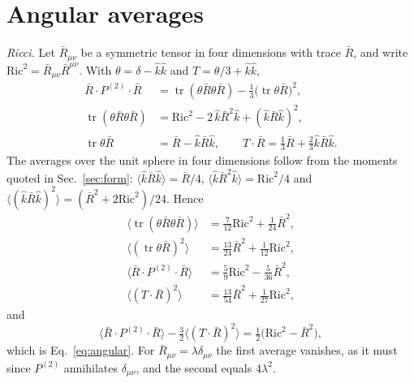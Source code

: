 \documentclass[a4paper,11pt]{article}
\newcommand{\Pt}{P^{(2)}}
\newcommand{\Ric}{\mathrm{Ric}}
\begin{document}
\section{Angular averages}
\label{app:angular}

\textit{Ricci.} Let $\bar R_{\mu\nu}$ be a symmetric tensor in four dimensions with trace $\bar R$, and write $\Ric^2=\bar R_{\mu\nu}\bar R^{\mu\nu}$. With $\theta=\delta-\hat k\hat k$ and $T=\theta/3+\hat k\hat k$,
\begin{align*}
\bar R\cdot\Pt\cdot\bar R&=\operatorname{tr}(\theta\bar R\theta\bar R)-\tfrac13\bigl(\operatorname{tr}\theta\bar R\bigr)^2,\\
\operatorname{tr}(\theta\bar R\theta\bar R)&=\Ric^2-2\,\hat k\bar R^2\hat k+(\hat k\bar R\hat k)^2,\\
\operatorname{tr}\theta\bar R&=\bar R-\hat k\bar R\hat k,\qquad T\cdot\bar R=\tfrac13\bar R+\tfrac23\hat k\bar R\hat k .
\end{align*}
The averages over the unit sphere in four dimensions follow from the moments quoted in Sec.~\ref{sec:form}: $\langle\hat k\bar R\hat k\rangle=\bar R/4$, $\langle\hat k\bar R^2\hat k\rangle=\Ric^2/4$ and $\langle(\hat k\bar R\hat k)^2\rangle=(\bar R^2+2\Ric^2)/24$. Hence
\begin{align*}
\langle\operatorname{tr}(\theta\bar R\theta\bar R)\rangle&=\tfrac7{12}\Ric^2+\tfrac1{24}\bar R^2,\\
\langle(\operatorname{tr}\theta\bar R)^2\rangle&=\tfrac{13}{24}\bar R^2+\tfrac1{12}\Ric^2,\\
\langle\bar R\cdot\Pt\cdot\bar R\rangle&=\tfrac59\Ric^2-\tfrac5{36}\bar R^2,\\
\langle(T\cdot\bar R)^2\rangle&=\tfrac{13}{54}\bar R^2+\tfrac1{27}\Ric^2,
\end{align*}
and
\[
\langle\bar R\cdot\Pt\cdot\bar R\rangle-\tfrac32\langle(T\cdot\bar R)^2\rangle=\tfrac12\bigl(\Ric^2-\bar R^2\bigr),
\]
which is Eq.~\eqref{eq:angular}. For $\bar R_{\mu\nu}=\lambda\delta_{\mu\nu}$ the first average vanishes, as it must since $\Pt$ annihilates $\delta_{\mu\nu}$, and the second equals $4\lambda^2$.
\end{document}

